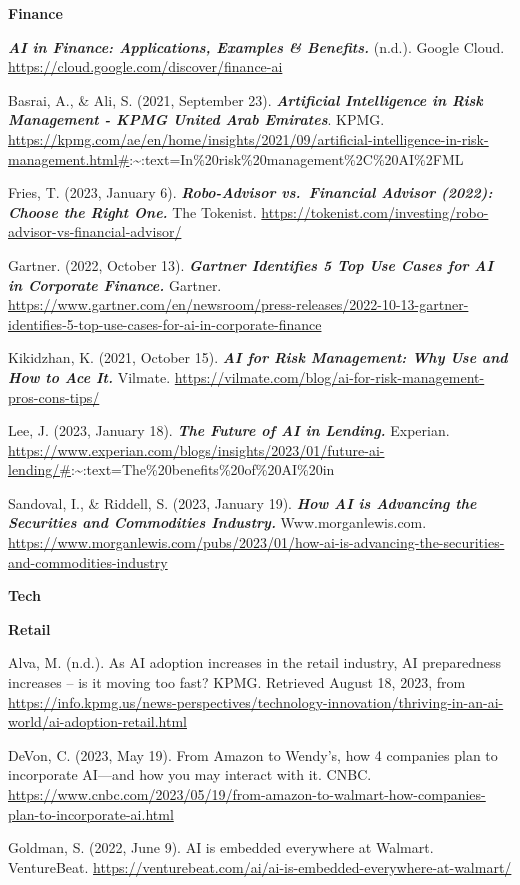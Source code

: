 \documentclass[
]{article}
\begin{document}
\textbf{Finance}

\textbf{\emph{AI in Finance: Applications, Examples \& Benefits.}} (n.d.). Google Cloud. \url{https://cloud.google.com/discover/finance-ai}

Basrai, A., \& Ali, S. (2021, September 23). \textbf{\emph{Artificial Intelligence in Risk Management - KPMG United Arab Emirates}}. KPMG. \url{https://kpmg.com/ae/en/home/insights/2021/09/artificial-intelligence-in-risk-management.html\#}:\textasciitilde:text=In\%20risk\%20management\%2C\%20AI\%2FML

Fries, T. (2023, January 6). \textbf{\emph{Robo-Advisor vs.~Financial Advisor (2022): Choose the Right One.}} The Tokenist. \url{https://tokenist.com/investing/robo-advisor-vs-financial-advisor/}

Gartner. (2022, October 13). \textbf{\emph{Gartner Identifies 5 Top Use Cases for AI in Corporate Finance.}} Gartner. \url{https://www.gartner.com/en/newsroom/press-releases/2022-10-13-gartner-identifies-5-top-use-cases-for-ai-in-corporate-finance}

Kikidzhan, K. (2021, October 15). \textbf{\emph{AI for Risk Management: Why Use and How to Ace It.}} Vilmate. \url{https://vilmate.com/blog/ai-for-risk-management-pros-cons-tips/}

Lee, J. (2023, January 18). \textbf{\emph{The Future of AI in Lending.}} Experian. \url{https://www.experian.com/blogs/insights/2023/01/future-ai-lending/\#}:\textasciitilde:text=The\%20benefits\%20of\%20AI\%20in

Sandoval, I., \& Riddell, S. (2023, January 19). \textbf{\emph{How AI is Advancing the Securities and Commodities Industry.}} Www.morganlewis.com. \url{https://www.morganlewis.com/pubs/2023/01/how-ai-is-advancing-the-securities-and-commodities-industry}

\textbf{Tech}

\textbf{Retail}

Alva, M. (n.d.). As AI adoption increases in the retail industry, AI preparedness increases -- is it moving too fast? KPMG. Retrieved August 18, 2023, from \url{https://info.kpmg.us/news-perspectives/technology-innovation/thriving-in-an-ai-world/ai-adoption-retail.html}

DeVon, C. (2023, May 19). From Amazon to Wendy's, how 4 companies plan to incorporate AI---and how you may interact with it. CNBC. \url{https://www.cnbc.com/2023/05/19/from-amazon-to-walmart-how-companies-plan-to-incorporate-ai.html}

Goldman, S. (2022, June 9). AI is embedded everywhere at Walmart. VentureBeat. \url{https://venturebeat.com/ai/ai-is-embedded-everywhere-at-walmart/}
\end{document}
